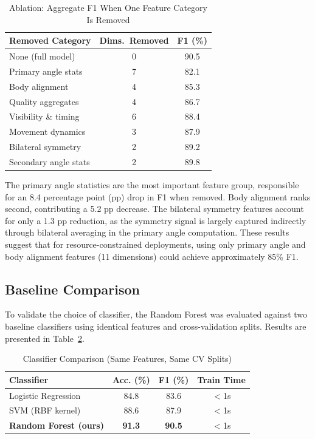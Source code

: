 \documentclass[conference]{IEEEtran}
\begin{document}
\begin{table}[ht]
\caption{Ablation: Aggregate F1 When One Feature Category Is Removed}
\label{tab:ablation}
\centering
\renewcommand{\arraystretch}{1.15}
\begin{tabular}{@{}lcc@{}}
\toprule
\textbf{Removed Category} & \textbf{Dims.\ Removed} & \textbf{F1 (\%)} \\
\midrule
None (full model) & 0 & 90.5 \\
Primary angle stats & 7 & 82.1 \\
Body alignment & 4 & 85.3 \\
Quality aggregates & 4 & 86.7 \\
Visibility \& timing & 6 & 88.4 \\
Movement dynamics & 3 & 87.9 \\
Bilateral symmetry & 2 & 89.2 \\
Secondary angle stats & 2 & 89.8 \\
\bottomrule
\end{tabular}
\end{table}

The primary angle statistics are the most important feature group, responsible for an 8.4 percentage point (pp) drop in F1 when removed. Body alignment ranks second, contributing a 5.2 pp decrease. The bilateral symmetry features account for only a 1.3 pp reduction, as the symmetry signal is largely captured indirectly through bilateral averaging in the primary angle computation. These results suggest that for resource-constrained deployments, using only primary angle and body alignment features (11 dimensions) could achieve approximately 85\% F1.

\subsection{Baseline Comparison}

To validate the choice of classifier, the Random Forest was evaluated against two baseline classifiers using identical features and cross-validation splits. Results are presented in Table~\ref{tab:baselines}.

\begin{table}[ht]
\caption{Classifier Comparison (Same Features, Same CV Splits)}
\label{tab:baselines}
\centering
\renewcommand{\arraystretch}{1.15}
\begin{tabular}{@{}lccc@{}}
\toprule
\textbf{Classifier} & \textbf{Acc. (\%)} & \textbf{F1 (\%)} & \textbf{Train Time} \\
\midrule
Logistic Regression & 84.8 & 83.6 & $<$1s \\
SVM (RBF kernel) & 88.6 & 87.9 & $<$1s \\
\textbf{Random Forest (ours)} & \textbf{91.3} & \textbf{90.5} & $<$1s \\
\bottomrule
\end{tabular}
\end{table}
\end{document}
